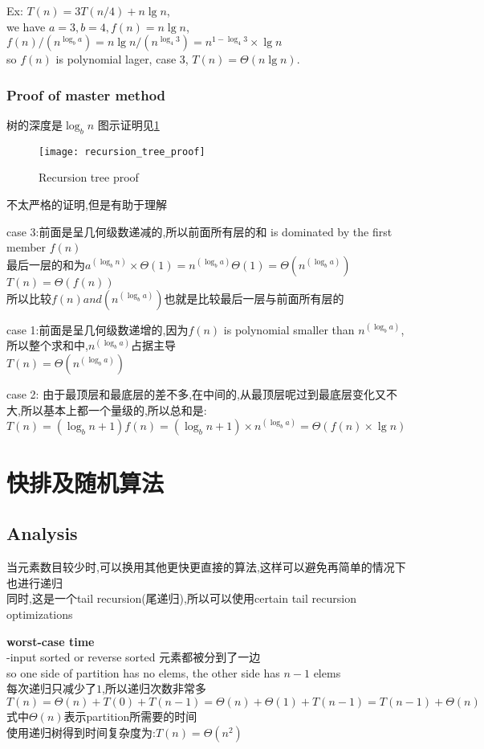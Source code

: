 \documentclass{article}
\begin{document}
Ex: $T(n) = 3T(n/4) + n \lg  n$,\\
we have $a = 3, b = 4, f (n) = n \lg  n$,\\
$f(n)/(n^{\log_b a})=n\lg n/(n^{\log_4 3})=n^{1 - \log_4 3} \times \lg n$\\
so $f(n)$ is polynomial lager, case $3$, $T(n) = \Theta(n\lg  n)$.

\subsubsection{Proof of master method}
树的深度是$\log_b n$
图示证明见\ref{fig.compute.recursion_tree.proof}
\begin{figure}[htbp]
  \centering
  \texttt{[image: recursion\_tree\_proof]}\\
  \caption{Recursion tree proof}\label{fig.compute.recursion_tree.proof}
\end{figure}
不太严格的证明,但是有助于理解\par
case 3:前面是呈几何级数递减的,所以前面所有层的和 is dominated by the first member $f(n)$\\
最后一层的和为$a^(\log_b n) \times  \Theta(1)=n^(\log_b a) \Theta(1)= \Theta(n^(\log_b a))$\\
$T(n)=\Theta(f(n))$\\
所以比较$f(n) and (n^(\log_b a))$也就是比较最后一层与前面所有层的

case 1:前面是呈几何级数递增的,因为$f(n)$ is polynomial smaller than $n^(\log_b a)$,所以整个求和中,$n^(\log_b a)$占据主导\\
$T(n)=\Theta(n^(\log_b a))$

case 2: 由于最顶层和最底层的差不多,在中间的,从最顶层呢过到最底层变化又不大,所以基本上都一个量级的,所以总和是:\\
$T(n)=(\log_b n+1)f(n)=(\log_b n+1) \times n^(\log_b a)=\Theta(f(n) \times \lg n)$

\section{快排及随机算法}
\subsection{Analysis}
当元素数目较少时,可以换用其他更快更直接的算法,这样可以避免再简单的情况下也进行递归\\
同时,这是一个tail recursion(尾递归),所以可以使用certain tail recursion optimizations

\textbf{worst-case time}\\
-input sorted or reverse sorted 元素都被分到了一边\\
so one side of partition has no elems, the other side has $n-1$ elems\\
每次递归只减少了$1$,所以递归次数非常多\\
$T(n)
= \Theta(n)+T(0)+T(n-1)
= \Theta(n) + \Theta(1)+T(n-1)
=T(n-1) + \Theta(n)$\\
式中$\Theta(n)$表示partition所需要的时间\\
使用递归树得到时间复杂度为:$T(n)=\Theta(n^2)$
\end{document}

